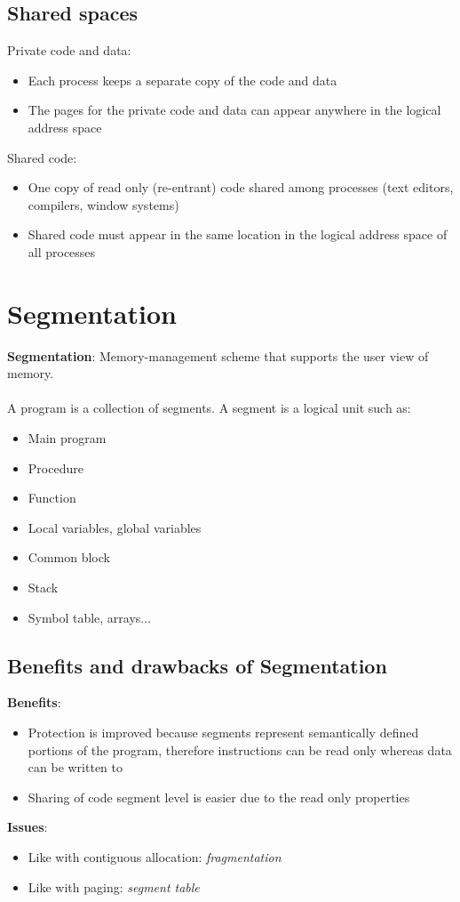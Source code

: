 \documentclass{article}[18pt]
\begin{document}
\subsection{Shared spaces}
Private code and data:
\begin{itemize}
	\item Each process keeps a separate copy of the code and data
	\item The pages for the private code and data can appear anywhere in the logical address space
\end{itemize}
Shared code:
\begin{itemize}
	\item One copy of read only (re-entrant) code shared among processes (text editors, compilers, window systems)
	\item Shared code must appear in the same location in the logical address space of all processes
\end{itemize}
\section{Segmentation}
\textbf{Segmentation}: Memory-management scheme that supports the user view of memory.\\
\\
A program is a collection of segments. A segment is a logical unit such as:
\begin{itemize}
	\item Main program
	\item Procedure
	\item Function
	\item Local variables, global variables
	\item Common block
	\item Stack
	\item Symbol table, arrays...
\end{itemize}
\subsection{Benefits and drawbacks of Segmentation}
\textbf{Benefits}:
\begin{itemize}
	\item Protection is improved because segments represent semantically defined portions of the program, therefore instructions can be read only whereas data can be written to
	\item Sharing of code segment level is easier due to the read only properties
\end{itemize}
\textbf{Issues}:
\begin{itemize}
	\item Like with contiguous allocation: \textit{fragmentation}
	\item Like with paging: \textit{segment table} 
\end{itemize}
\end{document}
